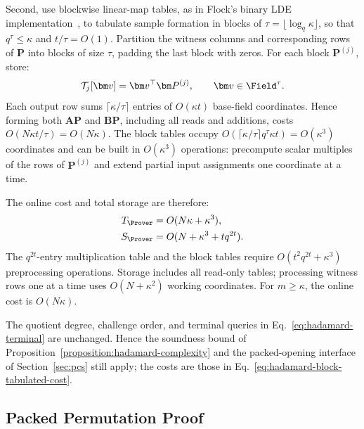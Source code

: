 Second, use blockwise linear-map tables, as in Flock's binary
LDE implementation~\cite[Section~4.2]{iacr/BunzRW26}, to tabulate
sample formation in blocks of
\(\tau=\lfloor\log_q\kappa\rfloor\), so that
\(q^\tau\leq\kappa\) and \(t/\tau=O(1)\).
Partition the witness columns and corresponding rows of \(\bm P\)
into blocks of size \(\tau\), padding the last block with zeros.
For each block \(\bm P^{(j)}\), store:
\begin{equation}
    \mathcal T_j[\bm v]=\bm v^\top\bm P^{(j)},
    \qquad \bm v\in\Field^\tau.
\label{eq:hadamard-block-table}
\end{equation}
Each output row sums \(\lceil\kappa/\tau\rceil\) entries of
\(O(\kappa t)\) base-field coordinates. Hence forming both
\(\bm A\bm P\) and \(\bm B\bm P\), including all reads and
additions, costs \(O(N\kappa t/\tau)=O(N\kappa)\).
The block tables occupy
\(O(\lceil\kappa/\tau\rceil q^\tau\kappa t)=O(\kappa^3)\)
coordinates and can be built in \(O(\kappa^3)\) operations:
precompute scalar multiples of the rows of \(\bm P^{(j)}\)
and extend partial input assignments one coordinate at a time.

The online cost and total storage are therefore:
\begin{equation}
\begin{aligned}
    T_{\Prover}&=O(N\kappa+\kappa^3),\\
    S_{\Prover}&=O(N+\kappa^3+tq^{2t}).
\end{aligned}
\label{eq:hadamard-block-tabulated-cost}
\end{equation}
The \(q^{2t}\)-entry multiplication table and the block tables
require \(O(t^2q^{2t}+\kappa^3)\) preprocessing operations.
Storage includes all read-only tables; processing witness rows
one at a time uses \(O(N+\kappa^2)\) working coordinates.
For \(m\geq\kappa\), the online cost is \(O(N\kappa)\).

The quotient degree, challenge order, and terminal queries in
Eq.~\eqref{eq:hadamard-terminal} are unchanged. Hence the
soundness bound of Proposition~\ref{proposition:hadamard-complexity}
and the packed-opening interface of Section~\ref{sec:pcs} still
apply; the costs are those in
Eq.~\eqref{eq:hadamard-block-tabulated-cost}.

\subsection{Packed Permutation Proof}
\label{sec:permutation}

